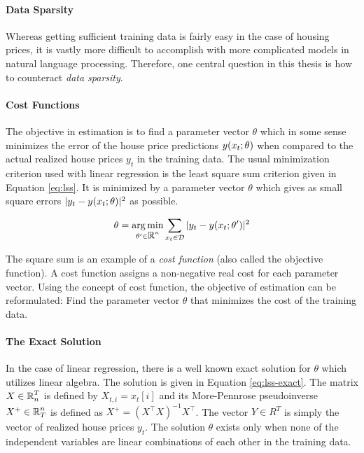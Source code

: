 \paragraph{Data Sparsity} Whereas getting sufficient training data is
fairly easy in the case of housing prices, it is vastly more difficult
to accomplish with more complicated models in natural language
processing. Therefore, one central question in this thesis is how to
counteract {\it data sparsity}.

\paragraph{Cost Functions} The objective in estimation is to find a
parameter vector $\theta$ which in some sense minimizes the error of
the house price predictions $y(x_t\mbox{$ ; \, $} \theta)$ when compared to
the actual realized house prices $y_t$ in the training data. The usual
minimization criterion used with linear regression is the least square
sum criterion given in Equation \ref{eq:lss}. It is minimized by a
parameter vector $\theta$ which gives as small square errors $|y_t -
y(x_t \mbox{$ ; \, $} \theta)|^2$ as possible.

\begin{equation}
\theta = \operatorname*{arg\,min}_{\theta' \in \mbox{$\mathbb R$}^n} \sum_{x_t \in \mathcal{D}} | y_t - y(x_t\mbox{$ ; \, $} \theta')|^2\label{eq:lss}
\end{equation}

The square sum is an example of a {\it cost function} (also
called the objective function). A cost function assigns a non-negative
real cost for each parameter vector. Using the concept of cost
function, the objective of estimation can be reformulated: Find the
parameter vector $\theta$ that minimizes the cost of the training
data.

\paragraph{The Exact Solution} In the case of linear regression, there
is a well known exact solution for $\theta$ which utilizes linear
algebra. The solution is given in Equation \ref{eq:lss-exact}. The
matrix $X \in \mbox{$\mathbb R$}^T_n$ is defined by $X_{t,i} = x_t[i]$ and its
More-Pennrose pseudoinverse $X^+ \in \mbox{$\mathbb R$}^n_T$ is defined as $X^+ =
(X^\top X)^{-1}X^\top$. The vector $Y \in R^T$ is simply the vector of
realized house prices $y_t$. The solution $\theta$ exists only when
none of the independent variables are linear combinations of each
other in the training data.

